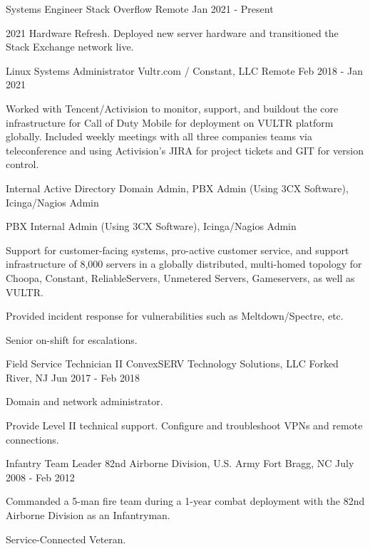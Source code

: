 
\begin{cventries}

	\cventry
	{Systems Engineer}
	{Stack Overflow}
	{Remote}
	{Jan 2021 - Present}
	{
		\begin{cvitems}
		\item {2021 Hardware Refresh. Deployed new server hardware and transitioned the Stack Exchange network live.}
		\end{cvitems}
	}


	\cventry
	{Linux Systems Administrator}
	{Vultr.com / Constant, LLC}
	{Remote}
	{Feb 2018 - Jan 2021}
	{
		\begin{cvitems}
		\item {Worked with Tencent/Activision to monitor, support, and buildout the core infrastructure for Call of Duty Mobile for deployment on VULTR platform globally. Included weekly meetings with all three companies teams via teleconference and using Activision's JIRA for project tickets and GIT for version control.}
		\item {Internal Active Directory Domain Admin, PBX Admin (Using 3CX Software), Icinga/Nagios Admin }
		\item {PBX Internal Admin (Using 3CX Software), Icinga/Nagios Admin }
		\item {Support for customer-facing systems, pro-active customer service, and support infrastructure of 8,000 servers in a globally distributed, multi-homed topology for Choopa, Constant, ReliableServers, Unmetered Servers, Gameservers, as well as VULTR.}
		\item {Provided incident response for vulnerabilities such as Meltdown/Spectre, etc.}
		\item {Senior on-shift for escalations.}
		\end{cvitems}
	}


	\cventry
	{Field Service Technician II}
	{ConvexSERV Technology Solutions, LLC}
	{Forked River, NJ}
	{Jun 2017 - Feb 2018}
	{
		\begin{cvitems}
		\item {Domain and network administrator.}
		\item {Provide Level II technical support. Configure and troubleshoot VPNs and remote connections.}
		\end{cvitems}
	}


	\cventry
	{Infantry Team Leader}
	{82nd Airborne Division, U.S. Army}
	{Fort Bragg, NC}
	{July 2008 - Feb 2012}
	{
		\begin{cvitems}
		\item {Commanded a 5-man fire team during a 1-year combat deployment with the 82nd Airborne Division as an Infantryman.}
		\item {Service-Connected Veteran.}
		\end{cvitems}
	}

\end{cventries}
